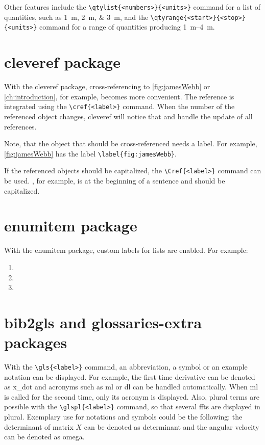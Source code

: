 Other features include the \verb|\qtylist{<numbers>}{<units>}| command for a list of quantities, such as \qtylist{1; 2; 3}{\meter}, and the \verb|\qtyrange{<start>}{<stop>}{<units>}| command for a range of quantities producing \qtyrange{1}{4}{\meter}.
%
\section{cleveref package}%
\label{sec:cleveref}
With the cleveref package, cross-referencing to \cref{fig:jamesWebb} or \cref{ch:introduction}, for example, becomes more convenient. The reference is integrated using the \verb|\cref{<label>}| command. When the number of the referenced object changes, cleveref will notice that and handle the update of all references. 

Note, that the object that should be cross-referenced needs a label. For example, \cref{fig:jamesWebb} has the label \verb|\label{fig:jamesWebb}|.

If the referenced objects should be capitalized, the \verb|\Cref{<label>}| command can be used. , for example, is at the beginning of a sentence and should be capitalized. 
%
\section{enumitem package}%
\label{sec:enumitem}
With the enumitem package, custom labels for lists are enabled. For example:
\begin{enumerate}[leftmargin=*, align=left,start=1,label={\bfseries L\arabic*}]%
	\item \lipsum[0-1]
	\item \lipsum[0-1]
	\item \lipsum[0-1]
\end{enumerate}
%
\section{bib2gls and glossaries-extra packages}%
\label{sec:gls}
With the \verb|\gls{<label>}| command, an abbreviation, a symbol or an example notation can be displayed. For example, the first time derivative can be denoted as \gls{x_dot} and acronyms such as \gls{ml} or \gls{dl} can be handled automatically. When \gls{ml} is called for the second time, only its acronym is displayed. Also, plural terms are possible with the \verb|\glspl{<label>}| command, so that several \glspl{fft} are displayed in plural. Exemplary use for notations and symbols could be the following: the determinant of matrix $X$ can be denoted as \gls{determinant} and the angular velocity can be denoted as \gls{omega}. 
